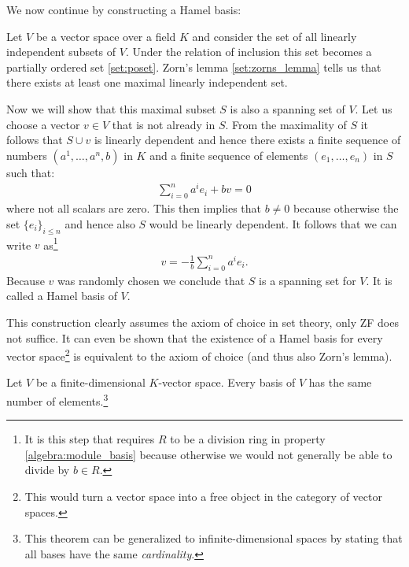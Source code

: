     We now continue by constructing a Hamel basis:
    \begin{construct}\label{linalgebra:hamel_basis}
        Let $V$ be a vector space over a field $K$ and consider the set of all linearly independent subsets of $V$. Under the relation of inclusion this set becomes a partially ordered set \ref{set:poset}. Zorn's lemma \ref{set:zorns_lemma} tells us that there exists at least one maximal linearly independent set.

        Now we will show that this maximal subset $S$ is also a spanning set of $V$. Let us choose a vector $v\in V$ that is not already in $S$. From the maximality of $S$ it follows that $S\cup v$ is linearly dependent and hence there exists a finite sequence of numbers $(a^1, \ldots, a^n, b)$ in $K$ and a finite sequence of elements $(e_1, \ldots, e_n)$ in $S$ such that:
        \begin{gather}
            \sum_{i=0}^n a^ie_i + bv = 0
        \end{gather}
        where not all scalars are zero. This then implies that $b\neq0$ because otherwise the set $\{e_i\}_{i\leq n}$ and hence also $S$ would be linearly dependent. It follows that we can write $v$ as\footnote{It is this step that requires $R$ to be a division ring in property \ref{algebra:module_basis} because otherwise we would not generally be able to divide by $b\in R$.}
        \begin{gather}
            v = -\frac{1}{b}\sum_{i=0}^na^ie_i.
        \end{gather}
        Because $v$ was randomly chosen we conclude that $S$ is a spanning set for $V$. It is called a Hamel basis of $V$.
    \end{construct}
    \begin{remark}
        This construction clearly assumes the axiom of choice in set theory, only ZF does not suffice. It can even be shown that the existence of a Hamel basis for every vector space\footnote{This would turn a vector space into a free object in the category of vector spaces.} is equivalent to the axiom of choice (and thus also Zorn's lemma).
    \end{remark}

    \begin{property}
        Let $V$ be a finite-dimensional $K$-vector space. Every basis of $V$ has the same number of elements.\footnote{This theorem can be generalized to infinite-dimensional spaces by stating that all bases have the same \textit{cardinality}.}
    \end{property}

